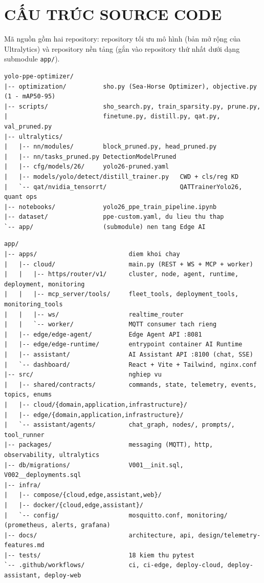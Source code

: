 \chapter{CẤU TRÚC SOURCE CODE}

Mã nguồn gồm hai repository: repository tối ưu mô hình (bản mở rộng của
Ultralytics) và repository nền tảng (gắn vào repository thứ nhất dưới dạng
submodule \texttt{app/}).

\begin{lstlisting}[caption={Cấu trúc repository tối ưu mô hình}]
yolo-ppe-optimizer/
|-- optimization/          sho.py (Sea-Horse Optimizer), objective.py (1 - mAP50-95)
|-- scripts/               sho_search.py, train_sparsity.py, prune.py,
|                          finetune.py, distill.py, qat.py, val_pruned.py
|-- ultralytics/
|   |-- nn/modules/        block_pruned.py, head_pruned.py
|   |-- nn/tasks_pruned.py DetectionModelPruned
|   |-- cfg/models/26/     yolo26-pruned.yaml
|   |-- models/yolo/detect/distill_trainer.py   CWD + cls/reg KD
|   `-- qat/nvidia_tensorrt/                    QATTrainerYolo26, quant ops
|-- notebooks/             yolo26_ppe_train_pipeline.ipynb
|-- dataset/               ppe-custom.yaml, du lieu thu thap
`-- app/                   (submodule) nen tang Edge AI
\end{lstlisting}

\begin{lstlisting}[caption={Cấu trúc repository nền tảng Edge AI}]
app/
|-- apps/                         diem khoi chay
|   |-- cloud/                    main.py (REST + WS + MCP + worker)
|   |   |-- https/router/v1/      cluster, node, agent, runtime, deployment, monitoring
|   |   |-- mcp_server/tools/     fleet_tools, deployment_tools, monitoring_tools
|   |   |-- ws/                   realtime_router
|   |   `-- worker/               MQTT consumer tach rieng
|   |-- edge/edge-agent/          Edge Agent API :8081
|   |-- edge/edge-runtime/        entrypoint container AI Runtime
|   |-- assistant/                AI Assistant API :8100 (chat, SSE)
|   `-- dashboard/                React + Vite + Tailwind, nginx.conf
|-- src/                          nghiep vu
|   |-- shared/contracts/         commands, state, telemetry, events, topics, enums
|   |-- cloud/{domain,application,infrastructure}/
|   |-- edge/{domain,application,infrastructure}/
|   `-- assistant/agents/         chat_graph, nodes/, prompts/, tool_runner
|-- packages/                     messaging (MQTT), http, observability, ultralytics
|-- db/migrations/                V001__init.sql, V002__deployments.sql
|-- infra/
|   |-- compose/{cloud,edge,assistant,web}/
|   |-- docker/{cloud,edge,assistant}/
|   `-- config/                   mosquitto.conf, monitoring/ (prometheus, alerts, grafana)
|-- docs/                         architecture, api, design/telemetry-features.md
|-- tests/                        18 kiem thu pytest
`-- .github/workflows/            ci, ci-edge, deploy-cloud, deploy-assistant, deploy-web
\end{lstlisting}
